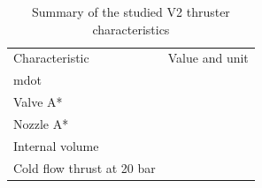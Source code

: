            \begin{table}[]
                \caption{Summary of the studied V2 thruster characteristics}
                \label{tab:characteristics}
                \begin{tabular}{ll}
                Characteristic             & Value and unit \\
                mdot                       &                \\
                Valve A*                   &                \\
                Nozzle A*                  &                \\
                Internal volume            &                \\
                Cold flow thrust at 20 bar &               
                \end{tabular}
            \end{table}
 

            

        



